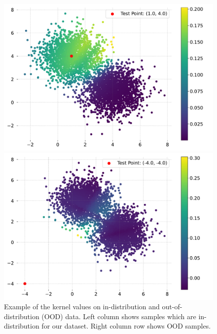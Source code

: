 \begin{figure}[!htb]
        \centering
        \begin{minipage}{0.45\textwidth}
            \centering
            \includegraphics[width=0.95\linewidth]{c3_figures/in_distribution.pdf}
            \captionsetup{labelformat=empty}
            \addtocounter{figure}{-1}
            \end{minipage}
            \begin{minipage}{0.45\textwidth}
                \centering
                \includegraphics[width=0.95\linewidth]{c3_figures/ood.pdf}
            \captionsetup{labelformat=empty}
            \addtocounter{figure}{-1}
            \end{minipage}
        \caption{Example of the kernel values on in-distribution and out-of-distribution (OOD) data. Left column shows samples which are in-distribution for our dataset. Right column row shows OOD samples.}
        \label{fig:kernel}
    \end{figure}
